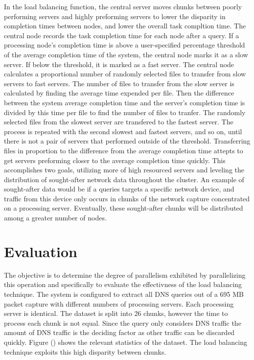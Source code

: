 \documentclass{article}
\begin{document}
\begin{multicols}{2}
In the load balancing function, the central server moves chunks between poorly performing servers and highly preforming servers to lower the disparity in completion times between nodes, and lower the overall task compltion time.  The central node records the task completion time for each node after a query.  If a processing node's completion time is above a user-specified percentage threshold of the average completion time of the system, the central node marks it as a slow server. If below the threshold, it is marked as a fast server.  The central node calculates a proportional number of randomly selected files to transfer from slow servers to fast servers. The number of files to transfer from the slow server is calculated by finding the average time expended per file.  Then the difference between the system average completion time and the server's completion time is divided by this time per file to find the number of files to tranfer. The randomly selected files from the slowest server are transfered to the fastest server.  The process is repeated with the second slowest and fastest servers, and so on, until there is not a pair of servers that performed outside of the threshold.  Transferring files in proportion to the difference from the average completion time attepts to get servers preforming closer to the average completion time quickly.  This accomplishes two goals, utilizing more of high resourced servers and leveling the distribution of sought-after network data throughout the cluster.  An example of sought-after data would be if a queries targets a specific network device, and traffic from this device only occurs in chunks of the network capture concentrated on a processing server.  Eventually, these sought-after chunks will be distributed among a greater number of nodes. 

\section*{Evaluation} 


The objective is to determine the degree of parallelism exhibited by parallelizing this operation and specifically to evaluate the effectivness of the load balancing technique. The system is configured to extract all DNS queries out of a 695 MB packet capture with different numbers of processing servers.  Each processing server is identical.  The dataset is split into 26 chunks, however the time to process each chunk is not equal.  Since the query only considers DNS traffic the amount of DNS traffic is the deciding factor as  other traffic can be discarded quickly.  Figure () shows the relevant statistics of the dataset.  The load balancing technique exploits this high disparity between chunks.  


\end{multicols}
\end{document}
